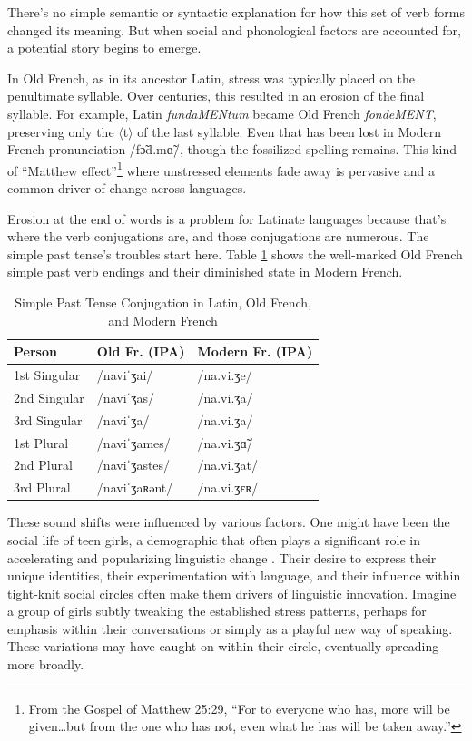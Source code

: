 There's no simple semantic or syntactic explanation for how this set of verb forms changed its meaning. But when social and phonological factors are accounted for, a potential story begins to emerge.

In Old French, as in its ancestor Latin, stress was typically placed on the penultimate syllable. Over centuries, this resulted in an erosion of the final syllable. For example, Latin \textit{fundaMENtum} became Old French \textit{fondeMENT}, preserving only the $\langle$t$\rangle$ of the last syllable. Even that has been lost in Modern French pronunciation /fɔ̃d.mɑ̃/, though the fossilized spelling remains. This kind of \enquote{Matthew effect}\footnote{From the Gospel of Matthew 25:29, \enquote{For to everyone who has, more will be given\dots but from the one who has not, even what he has will be taken away.}} where unstressed elements fade away is pervasive and a common driver of change across languages.

Erosion at the end of words is a problem for Latinate languages because that's where the verb conjugations are, and those conjugations are numerous. The simple past tense's troubles start here. Table \ref{table:past_tense_conjugation} shows the well-marked Old French simple past verb endings and their diminished state in Modern French.

\begin{table}[ht]
\centering
\begin{tabular}{lll}
\hline
\textbf{Person} & \textbf{Old Fr. (IPA)} & \textbf{Modern Fr. (IPA)} \\
\hline
1st Singular & /naviˈʒai/ & /na.vi.ʒe/ \\
2nd Singular  & /naviˈʒas/ & /na.vi.ʒa/ \\
3rd Singular  & /naviˈʒa/ & /na.vi.ʒa/ \\
1st Plural &  /naviˈʒames/ & /na.vi.ʒɑ̃/ \\
2nd Plural &  /naviˈʒastes/ & /na.vi.ʒat/ \\
3rd Plural &  /naviˈʒaʀənt/ & /na.vi.ʒɛʀ/ \\
\hline
\end{tabular}
\caption{Simple Past Tense Conjugation in Latin, Old French, and Modern French}
\label{table:past_tense_conjugation}
\end{table}

These sound shifts were influenced by various factors. One might have been the social life of teen girls, a demographic that often plays a significant role in accelerating and popularizing linguistic change \citep{labov2001}. Their desire to express their unique identities, their experimentation with language, and their influence within tight-knit social circles often make them drivers of linguistic innovation. Imagine a group of girls subtly tweaking the established stress patterns, perhaps for emphasis within their conversations or simply as a playful new way of speaking. These variations may have caught on within their circle, eventually spreading more broadly.

